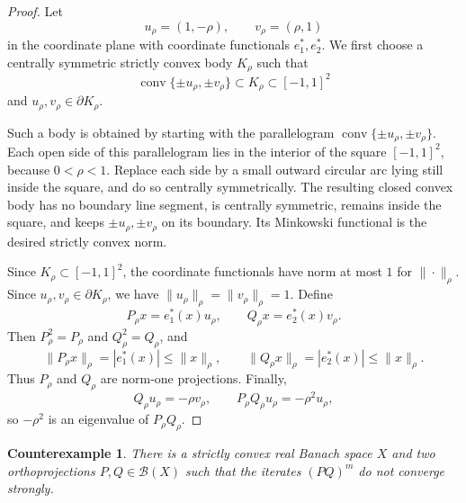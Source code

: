 \documentclass[11pt]{article}
\newtheorem*{theorem}{Counterexample}
\DeclareMathOperator{\conv}{conv}
\begin{document}
\begin{proof}
Let
\[
  u_\rho=(1,-\rho),\qquad v_\rho=(\rho,1)
\]
in the coordinate plane with coordinate functionals $e_1^*,e_2^*$.  We first
choose a centrally symmetric strictly convex body $K_\rho$ such that
\[
  \conv\{\pm u_\rho,\pm v_\rho\}\subset K_\rho\subset [-1,1]^2
\]
and $u_\rho,v_\rho\in\partial K_\rho$.

Such a body is obtained by starting with the parallelogram
$\conv\{\pm u_\rho,\pm v_\rho\}$.  Each open side of this parallelogram lies
in the interior of the square $[-1,1]^2$, because $0<\rho<1$.  Replace each
side by a small outward circular arc lying still inside the square, and do so
centrally symmetrically.  The resulting closed convex body has no boundary
line segment, is centrally symmetric, remains inside the square, and keeps
$\pm u_\rho,\pm v_\rho$ on its boundary.  Its Minkowski functional is the
desired strictly convex norm.

Since $K_\rho\subset[-1,1]^2$, the coordinate functionals have norm at most
$1$ for $\|\cdot\|_\rho$.  Since $u_\rho,v_\rho\in\partial K_\rho$, we have
$\|u_\rho\|_\rho=\|v_\rho\|_\rho=1$.  Define
\[
  P_\rho x=e_1^*(x)u_\rho,\qquad Q_\rho x=e_2^*(x)v_\rho.
\]
Then $P_\rho^2=P_\rho$ and $Q_\rho^2=Q_\rho$, and
\[
  \|P_\rho x\|_\rho=|e_1^*(x)|\leq \|x\|_\rho,\qquad
  \|Q_\rho x\|_\rho=|e_2^*(x)|\leq \|x\|_\rho.
\]
Thus $P_\rho$ and $Q_\rho$ are norm-one projections.  Finally,
\[
  Q_\rho u_\rho=-\rho v_\rho,\qquad
  P_\rho Q_\rho u_\rho=-\rho^2 u_\rho,
\]
so $-\rho^2$ is an eigenvalue of $P_\rho Q_\rho$.
\end{proof}

\begin{theorem}
There is a strictly convex real Banach space $X$ and two orthoprojections
$P,Q\in\mathcal B(X)$ such that the iterates $(PQ)^m$ do not converge
strongly.
\end{theorem}
\end{document}
